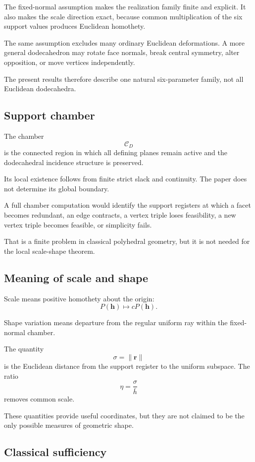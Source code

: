 The fixed-normal assumption makes the realization family finite and
explicit. It also makes the scale direction exact, because common
multiplication of the six support values produces Euclidean homothety.

The same assumption excludes many ordinary Euclidean deformations. A more
general dodecahedron may rotate face normals, break central symmetry, alter
opposition, or move vertices independently.

The present results therefore describe one natural six-parameter family,
not all Euclidean dodecahedra.

\subsection{Support chamber}

The chamber
\[
\mathcal C_D
\]
is the connected region in which all defining planes remain active and the
dodecahedral incidence structure is preserved.

Its local existence follows from finite strict slack and continuity. The
paper does not determine its global boundary.

A full chamber computation would identify the support registers at which a
facet becomes redundant, an edge contracts, a vertex triple loses
feasibility, a new vertex triple becomes feasible, or simplicity fails.

That is a finite problem in classical polyhedral geometry, but it is not
needed for the local scale-shape theorem.

\subsection{Meaning of scale and shape}

Scale means positive homothety about the origin:
\[
P(\mathbf h)
\longmapsto
cP(\mathbf h).
\]

Shape variation means departure from the regular uniform ray within the
fixed-normal chamber.

The quantity
\[
\sigma=\|\mathbf r\|
\]
is the Euclidean distance from the support register to the uniform
subspace. The ratio
\[
\eta=\frac{\sigma}{\bar h}
\]
removes common scale.

These quantities provide useful coordinates, but they are not claimed to be
the only possible measures of geometric shape.

\subsection{Classical sufficiency}

